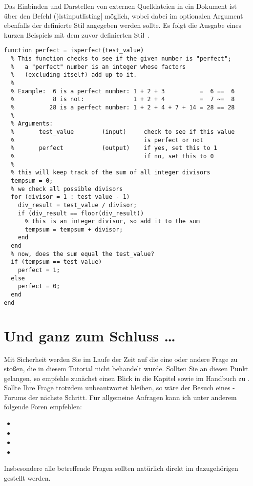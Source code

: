 \documentclass[%
  english,ngerman,%
  cdgeometry=no,DIV=12,%
  cd=false,cdfont=false,cdtitle=true,%
  headings=normal,%
  automark,%
  listof=toc,%
]{tudscrartcl}
\begin{document}
Das Einbinden und Darstellen von externen Quelldateien in ein Dokument ist über 
den Befehl \Macro(){lstinputlisting|\OList{}} 
möglich, wobei dabei im optionalen Argument ebenfalls der definierte Stil 
angegeben werden sollte. Es folgt die Ausgabe eines kurzen Beispiels mit dem 
zuvor definierten Stil~.
%
\begin{lstlisting}[style=matlab]
function perfect = isperfect(test_value)
  % This function checks to see if the given number is "perfect";
  %   a "perfect" number is an integer whose factors 
  %   (excluding itself) add up to it.
  %
  % Example:  6 is a perfect number: 1 + 2 + 3          =  6 ==  6
  %           8 is not:              1 + 2 + 4          =  7 ~=  8
  %          28 is a perfect number: 1 + 2 + 4 + 7 + 14 = 28 == 28
  %
  % Arguments:
  %       test_value        (input)     check to see if this value 
  %                                     is perfect or not
  %       perfect           (output)    if yes, set this to 1
  %                                     if no, set this to 0
  %
  % this will keep track of the sum of all integer divisors
  tempsum = 0;
  % we check all possible divisors
  for (divisor = 1 : test_value - 1)
    div_result = test_value / divisor;
    if (div_result == floor(div_result)) 
      % this is an integer divisor, so add it to the sum
      tempsum = tempsum + divisor;
    end
  end
  % now, does the sum equal the test_value?
  if (tempsum == test_value) 
    perfect = 1;
  else
    perfect = 0;
  end
end
\end{lstlisting}



\section{Und ganz zum Schluss \dots}

Mit Sicherheit werden Sie im Laufe der Zeit auf die eine oder andere Frage zu 
 stoßen, die in diesem Tutorial nicht behandelt wurde. Sollten 
Sie an diesen Punkt gelangen, so empfehle zunächst einen Blick in die Kapitel 
sowie  im Handbuch zu 
\TUDScript. Sollte Ihre Frage trotzdem unbeantwortet bleiben, so wäre der 
Besuch eines -Forums der nächste Schritt. Für allgemeine 
Anfragen kann ich unter anderem folgende Foren empfehlen:
%
\begin{itemize}
\item {}
\item {}
\item {}
\item {}
\end{itemize} 
%
Insbesondere alle \TUDScript betreffende Fragen sollten natürlich direkt im 
dazugehörigen \Forum gestellt werden.
\end{document}
